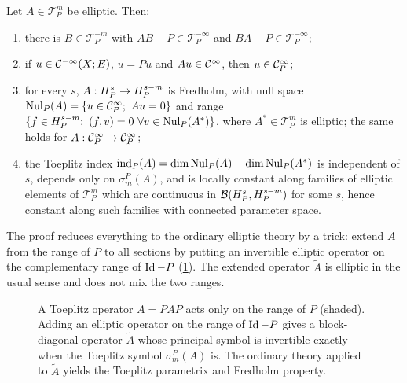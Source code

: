 \begin{theorem}\label{manifolds:thm:toeplitz-fredholm}
Let $A\in\mathcal T^m_P$ be elliptic. Then:
\begin{enumerate}[label=\textup{(\alph*)}]
\item there is $B\in\mathcal T^{-m}_P$ with $AB-P\in\mathcal T^{-\infty}_P$ and $BA-P\in\mathcal T^{-\infty}_P$;
\item if $u\in\mathcal{C}^{-\infty}(X;E)$, $u=Pu$ and $Au\in\mathcal{C}^\infty$, then $u\in\mathcal{C}^\infty_P$;
\item for every $s$, $A:H^{s}_P\to H^{s-m}_P$ is Fredholm, with null space
$\Nul_P(A)=\{u\in\CI_P;\ Au=0\}$ and range $\{f\in\Hs{s-m}_P;\ \inner fv=0\ \forall v\in\Nul_P(A^*)\}$,
where $A^*\in\mathcal T^m_P$ is elliptic; the same holds for $A:\mathcal{C}^\infty_P\to\mathcal{C}^\infty_P$;
\item the Toeplitz index $\operatorname{ind}_P(A)=\dim\operatorname{Nul}_P(A)-\dim\operatorname{Nul}_P(A^*)$ is independent of $s$,
depends only on $\sigma^P_m(A)$, and is locally constant along families of elliptic elements of
$\mathcal T^m_P$ which are continuous in $\mathcal{B}(H^{s}_P,H^{s-m}_P)$ for some $s$, hence
constant along such families with connected parameter space.
\end{enumerate}
\end{theorem}

The proof reduces everything to the ordinary elliptic theory by a trick:
extend $A$ from the range of $P$ to all sections by putting an invertible
elliptic operator on the complementary range of $\operatorname{Id}-P$
(\cref{manifolds:fig:toeplitz}). The extended operator $\tilde A$ is elliptic
in the usual sense and does not mix the two ranges.

\begin{figure}[ht]
\centering
{}
\caption{A Toeplitz operator $A=PAP$ acts only on the range of $P$ (shaded).
Adding an elliptic operator on the range of $\operatorname{Id}-P$ gives a block-diagonal
operator $\tilde A$ whose principal symbol is invertible exactly when the
Toeplitz symbol $\sigma^P_m(A)$ is. The ordinary theory applied to $\tilde A$
yields the Toeplitz parametrix and Fredholm property.}
\label{manifolds:fig:toeplitz}
\end{figure}

